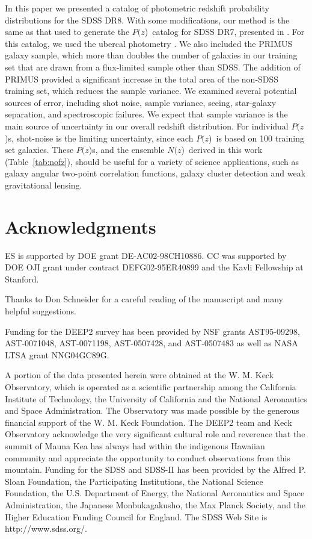 \documentclass[preprint]{aastex}
\newcommand{\pofz}{$P(z$)}
\newcommand{\nofz}{$N(z$)}
\begin{document}
In this paper we presented a catalog of photometric redshift probability
distributions for the SDSS DR8.  With some modifications, our method is the
same as that used to generate the \pofz\ catalog for SDSS DR7, presented in
\cite{CunhaPhotoz09}.  For this catalog, we used the ubercal photometry
\citep{Nikhil08}.  We also included the PRIMUS galaxy sample, which more than
doubles the number of galaxies in our training set that are drawn from a
flux-limited sample other than SDSS.  The addition of PRIMUS provided a
significant increase in the total area of the non-SDSS training set, which
reduces the sample variance.  We examined several potential sources of error,
including shot noise, sample variance, seeing, star-galaxy separation, and
spectroscopic failures.  We expect that sample variance is the main source of
uncertainty in our overall redshift distribution.  For individual \pofz s,
shot-noise is the limiting uncertainty, since each \pofz\ is based on 100
training set galaxies.  These \pofz s, and the ensemble \nofz\ derived in this
work (Table~\ref{tab:nofz}), should be useful for a variety of science
applications, such as galaxy angular two-point correlation functions, galaxy
cluster detection and weak gravitational lensing.


\section*{Acknowledgments}

ES is supported by DOE grant DE-AC02-98CH10886.  CC was supported by DOE OJI
grant under contract DEFG02-95ER40899 and the Kavli Fellowship at Stanford.

Thanks to Don Schneider for a careful reading of the manuscript and many
helpful suggestions.

Funding for the DEEP2 survey has been provided by NSF grants AST95-09298,
AST-0071048, AST-0071198, AST-0507428, and AST-0507483 as well as NASA LTSA
grant NNG04GC89G. 

A portion of the data presented herein were obtained at the W. M. Keck
Observatory, which is operated as a scientific partnership among the California
Institute of Technology, the University of California and the National
Aeronautics and Space Administration. The Observatory was made possible by the
generous financial support of the W. M. Keck Foundation. The DEEP2 team and
Keck Observatory acknowledge the very significant cultural role and reverence
that the summit of Mauna Kea has always had within the indigenous Hawaiian
community and appreciate the opportunity to conduct observations from this
mountain.  Funding for the SDSS and SDSS-II has been provided by the Alfred P.
Sloan Foundation, the Participating Institutions, the National Science
Foundation, the U.S. Department of Energy, the National Aeronautics and Space
Administration, the Japanese Monbukagakusho, the Max Planck Society, and the
Higher Education Funding Council for England. The SDSS Web Site is
http://www.sdss.org/.
\end{document}
